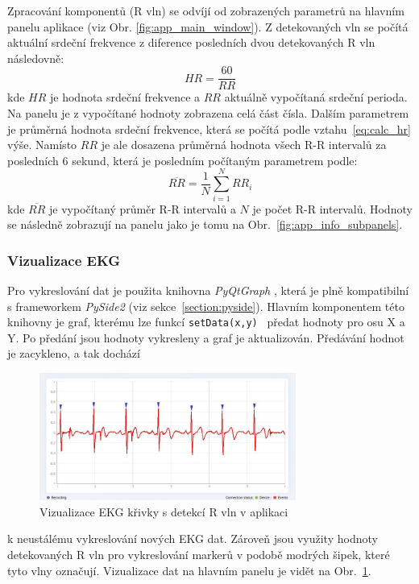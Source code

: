 Zpracování komponentů (R vln) se odvíjí od zobrazených parametrů na hlavním
panelu aplikace (viz Obr. \ref{fig:app_main_window}). Z detekovaných vln se
počítá aktuální srdeční frekvence z diference posledních dvou detekovaných R vln
následovně:
\begin{equation}
    \label{eq:calc_hr}
    HR = \frac{60}{RR}
\end{equation}
kde $HR$ je hodnota srdeční frekvence a $RR$ aktuálně vypočítaná srdeční
perioda. Na panelu je z vypočítané hodnoty zobrazena celá část čísla. Dalším
parametrem je průměrná hodnota srdeční frekvence, která se počítá podle
vztahu~\ref{eq:calc_hr} výše. Namísto $RR$ je ale dosazena průměrná hodnota
všech R-R intervalů za posledních 6 sekund, která je posledním počítaným
parametrem podle:
\begin{equation}
    \overline{RR} = \frac{1}{N} \sum_{i=1}^N RR_i
\end{equation}
kde $\overline{RR}$ je vypočítaný průměr R-R intervalů a $N$ je počet R-R
intervalů. Hodnoty se následně zobrazují na panelu jako je tomu na
Obr.~\ref{fig:app_info_subpanels}.

\subsubsection{Vizualizace EKG}
\label{section:visual}
Pro vykreslování dat je použita knihovna \textit{PyQtGraph} \cite{PyQtGraph},
která je plně kompatibilní s frameworkem \textit{PySide2} (viz
sekce~\ref{section:pyside}). Hlavním komponentem této knihovny je graf, kterému
lze funkcí \texttt{setData(x,y)}~\cite{curveItem} předat hodnoty pro osu X a Y.
Po předání jsou hodnoty vykresleny a graf je aktualizován. Předávání hodnot je
zacykleno, a tak dochází
\begin{figure}[H]
    \begin{center}
        \includegraphics[width=0.75\textwidth]{../assets/bbpm/r_detection}
        \caption{Vizualizace EKG křivky s detekcí R vln v aplikaci}
        \label{fig:app_ecg_visual}
    \end{center}
\end{figure}
\noindent k neustálému vykreslování nových EKG dat. Zároveň jsou využity hodnoty
detekovaných R vln pro vykreslování markerů v podobě modrých šipek, které tyto
vlny označují. Vizualizace dat na hlavním panelu je vidět na
Obr.~\ref{fig:app_ecg_visual}.

